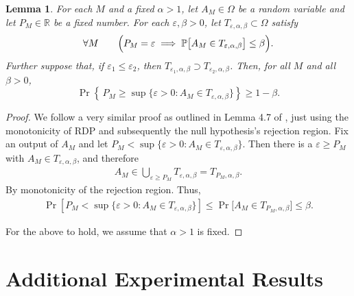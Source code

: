 \documentclass{article}
\theoremstyle{plain}
\newtheorem{lemma}[theorem]{Lemma}
\theoremstyle{definition}
\theoremstyle{remark}
\begin{document}
\begin{lemma}
\label{lem:conversion-app}
For each $M$ and a fixed $\alpha > 1$, let $A_M \in \Omega$ be a random variable and let $P_M \in \mathbb{R}$ be a fixed number.
For each $\varepsilon,\beta>0$, let $T_{\varepsilon,\alpha,\beta}\subset \Omega$ satisfy
\begin{equation}
\forall M\qquad
\Bigl(P_M=\varepsilon \;\Longrightarrow\; \mathbb{P}\bigl[A_M \in T_{\varepsilon,\alpha,\beta}\bigr]\le \beta\Bigr).
\end{equation}
Further suppose that, if $\varepsilon_1 \le \varepsilon_2$, then
$T_{\varepsilon_1,\alpha,\beta} \supset T_{\varepsilon_2,\alpha,\beta}$.
Then, for all $M$ and all $\beta>0$,
\begin{equation}
\Pr\!\left\{\,P_M \ge
\sup\{\varepsilon>0 : A_M \in T_{\varepsilon,\alpha,\beta}\}\right\}
\ge 1-\beta.
\end{equation}
\end{lemma}
\begin{proof}
We follow a very similar proof as outlined in Lemma 4.7 of \cite{steinke2023privacy}, just using the monotonicity of RDP and subsequently the null hypothesis's rejection region. Fix an output of $A_M$ and let $P_M < \sup\{\varepsilon>0 : A_M \in T_{\varepsilon,\alpha,\beta}\}$. Then there is a $\varepsilon \ge P_M$ with $A_M \in T_{\varepsilon,\alpha,\beta}$, and therefore 
\begin{align}
    \label{eqn:union}
    A_M \in \bigcup_{\varepsilon \ge P_M} T_{\varepsilon,\alpha,\beta} = T_{P_M,\alpha,\beta}.
\end{align}
By monotonicity of the rejection region. Thus, 
\begin{align}
\Pr\!\left[P_M < \sup\{\varepsilon > 0 : A_M \in T_{\varepsilon,\alpha, \beta}\}\right]
\le
\Pr\bigl[A_M \in T_{P_M,\alpha,\beta}\bigr]
\le \beta.
\end{align}

For the above to hold, we assume that $\alpha > 1$ is fixed. 
\end{proof}

\section{Additional Experimental Results}
\label{sec:more-experiments}
\end{document}
